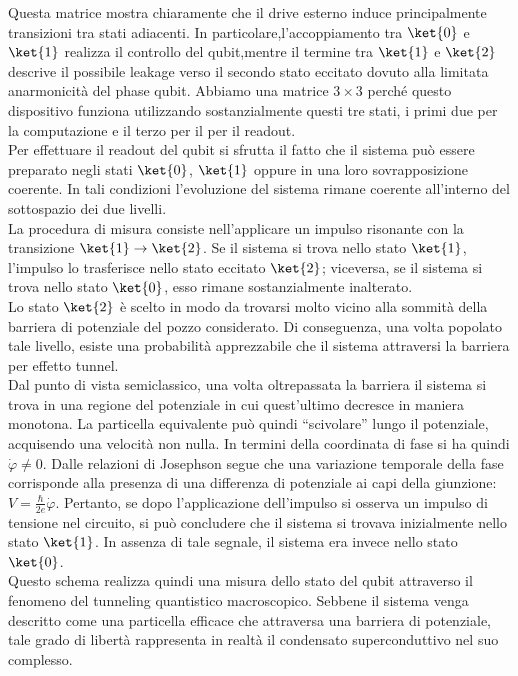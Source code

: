 Questa matrice mostra chiaramente che il drive esterno induce principalmente transizioni tra stati adiacenti. In particolare,l'accoppiamento tra $\ket{0}$ e $\ket{1}$ realizza il controllo del qubit,mentre il termine tra $\ket{1}$ e $\ket{2}$ descrive il possibile leakage verso il secondo stato eccitato dovuto alla limitata anarmonicità del
phase qubit. Abbiamo una matrice $3 \times 3$ perché questo dispositivo funziona utilizzando sostanzialmente questi tre stati, i primi due per la computazione e il terzo per il per il readout.\\
Per effettuare il readout del qubit si sfrutta il fatto che il sistema può essere preparato negli stati $\ket{0}$, $\ket{1}$ oppure in una loro sovrapposizione coerente. In tali condizioni l'evoluzione del sistema rimane coerente all'interno del sottospazio dei due livelli.\\
La procedura di misura consiste nell'applicare un impulso risonante con la transizione $\ket{1}\rightarrow\ket{2}$. Se il sistema si trova nello stato $\ket{1}$, l'impulso lo trasferisce nello stato eccitato $\ket{2}$; viceversa, se il sistema si trova nello stato $\ket{0}$, esso rimane sostanzialmente inalterato.\\
Lo stato $\ket{2}$ è scelto in modo da trovarsi molto vicino alla sommità della barriera di potenziale del pozzo considerato. Di conseguenza, una volta popolato tale livello, esiste una probabilità apprezzabile che il sistema attraversi la barriera per effetto tunnel.\\
Dal punto di vista semiclassico, una volta oltrepassata la barriera il sistema si trova in una regione del potenziale in cui quest'ultimo decresce in maniera monotona. La particella equivalente può quindi ``scivolare'' lungo il potenziale, acquisendo una velocità non nulla. In termini della coordinata di fase si ha quindi $\dot{\varphi}\neq 0$. Dalle relazioni di Josephson segue che una variazione temporale della fase corrisponde alla presenza di una differenza di potenziale ai capi della giunzione: $V=\frac{\hbar}{2e} \dot{\varphi}$. Pertanto, se dopo l'applicazione dell'impulso si osserva un impulso di tensione nel circuito, si può concludere che il sistema si trovava inizialmente nello stato $\ket{1}$. In assenza di tale segnale, il sistema era invece nello stato $\ket{0}$.\\
Questo schema realizza quindi una misura dello stato del qubit attraverso il fenomeno del tunneling quantistico macroscopico. Sebbene il sistema venga descritto come una particella efficace che attraversa una barriera di potenziale, tale grado di libertà rappresenta in realtà il condensato superconduttivo nel suo complesso.\\
